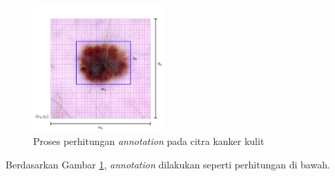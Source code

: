     \begin{figure}[H]
        \centering
            \includegraphics[width=5cm]{img/bab4/annotation.png}
        \caption{Proses perhitungan \textit{annotation} pada citra kanker kulit}
        \label{fig:d-annotation}
    \end{figure}

    Berdasarkan Gambar \ref{fig:d-annotation}, \textit{annotation} dilakukan seperti perhitungan di bawah.

